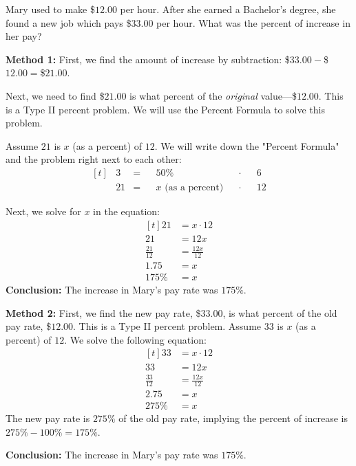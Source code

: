 \begin{myexample}
Mary used to make \$$12.00$ per hour. After she earned a Bachelor's degree, she found a new job which pays \$$33.00$ per hour. What was the percent of increase in her pay?
\end{myexample}
\begin{solution}

\textbf{Method 1:} First, we find the amount of increase by subtraction: \$$33.00-$\$$12.00=$\$$21.00$.

Next, we need to find \$$21.00$ is what percent of the \textit{original} value---\$$12.00$. This is a Type II percent problem. We will use the Percent Formula to solve this problem.

Assume $21$ is $x$ (as a percent) of $12$. We will write down the "Percent Formula" and the problem right next to each other:
\[
\begin{aligned}[t]
	&3 &= &&50\% &&\cdot &&6 \\
	&21 &= &&x \text{ (as a percent)} &&\cdot &&12
\end{aligned}
\]

Next, we solve for $x$ in the equation:
\[
\begin{aligned}[t]
	21 &= x \cdot 12 \\
	21 &= 12x \\
	\frac{21}{12} &= \frac{12x}{12} \\
	1.75 &= x \\
	175\% &= x
\end{aligned}
\]
\textbf{Conclusion: } The increase in Mary's pay rate was $175\%$.

\textbf{Method 2: } First, we find the new pay rate, \$$33.00$, is what percent of the old pay rate, \$$12.00$. This is a Type II percent problem. Assume $33$ is $x$ (as a percent) of $12$. We solve the following equation:
\[
\begin{aligned}[t]
	33 &= x \cdot 12 \\
	33 &= 12x \\
	\frac{33}{12} &= \frac{12x}{12} \\
	2.75 &= x \\
	275\% &= x
\end{aligned}
\]
The new pay rate is $275\%$ of the old pay rate, implying the percent of increase is $275\%-100\%=175\%$.

\textbf{Conclusion: } The increase in Mary's pay rate was $175\%$.

\end{solution}

